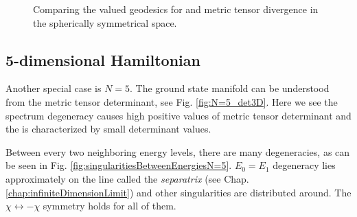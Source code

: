 \begin{figure}[H]
    \centering
    \vspace{30pt}
    \caption{Comparing the  valued geodesics for  and  metric tensor divergence in the spherically symmetrical space. }
    \label{fig:geodesicsinGR}
\end{figure}





\newpage
\subsection{5-dimensional Hamiltonian}
Another special case is $N=5$. The ground state manifold can be understood from the metric tensor determinant, see Fig. \ref{fig:N=5_det3D}. Here we see the spectrum degeneracy causes high positive values of metric tensor determinant and the  is characterized by small determinant values. 

Between every two neighboring energy levels, there are many degeneracies, as can be seen in Fig. \ref{fig:singularitiesBetweenEnergiesN=5}. $E_0=E_1$ degeneracy lies approximately on the line called the \emph{separatrix} (see Chap. \ref{chap:infiniteDimensionLimit}) and other singularities are distributed around. The $\chi\leftrightarrow-\chi$ symmetry holds for all of them.



